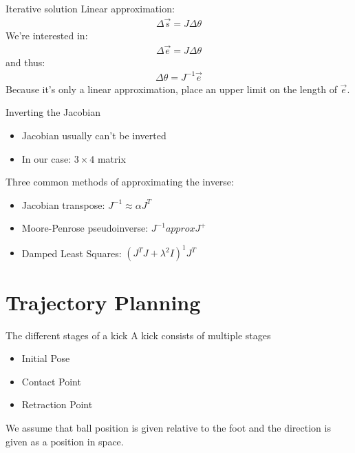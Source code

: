 \documentclass{beamer}
\begin{document}
\begin{frame}{Iterative solution}
  Linear approximation:
  \begin{align*}
    \Delta \vec{s} = J \Delta\theta
  \end{align*}
  We're interested in:
  \begin{align*}
    \Delta \vec{e} = J \Delta\theta
  \end{align*}
  and thus:
  \begin{align*}
    \Delta \theta = J^{-1} \vec{e}
  \end{align*}
  \pause
  Because it's only a linear approximation, place an upper limit on the length
  of $\vec{e}$.
\end{frame}

\begin{frame}{Inverting the Jacobian}
  \begin{itemize}
    \item Jacobian usually can't be inverted
    \item In our case: $3\times4$ matrix
  \end{itemize}
  \pause
  Three common methods of approximating the inverse:
  \begin{itemize}
    \item Jacobian transpose: $J^{-1} \approx \alpha J^T$
    \item Moore-Penrose pseudoinverse: $J^{-1} approx J^{+}$
    \item Damped Least Squares: $(J^T J  + \lambda^2 I)^1 J^T$
  \end{itemize}
\end{frame}

\section{Trajectory Planning}
\begin{frame}{The different stages of a kick}
    A kick consists of multiple stages
    \begin{itemize}
        \item Initial Pose
        \item Contact Point
        \item Retraction Point
    \end{itemize}
    We assume that ball position is given relative to the foot and the direction
    is given as a position in space.
\end{frame}
\end{document}
